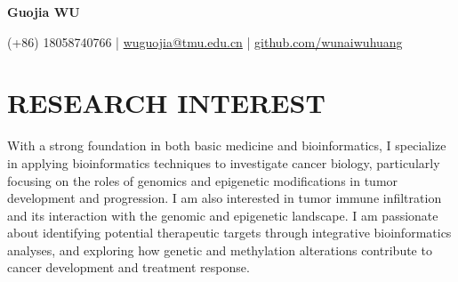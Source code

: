 \documentclass[a4paper,11pt]{article}
\newcommand{\socialicon}[1]{\raisebox{-0.05em}{\resizebox{!}{1em}{#1}}}
\newcommand{\headerfontiii}{\fontfamily{ppl}\selectfont} %
\begin{document}
\begin{justify}
\headerfontiii

\begin{center}
    {\Huge\textbf{Guojia WU}}
\end{center}
\vspace{-2mm}

\begin{center}
    \small{
    (+86) 18058740766 | \href{https://wuguojia@tmu.edu.cn}{wuguojia@tmu.edu.cn} | 
    \href{https://github.com/wunaiwuhuang}{github.com/wunaiwuhuang}
    }
\end{center}
\vspace{-8mm}


\vspace{2mm}

\section{\large{\textbf{RESEARCH INTEREST}}}
\vspace{1mm}
{
With a strong foundation in both basic medicine and bioinformatics, I specialize in applying bioinformatics techniques to investigate cancer biology, particularly focusing on the roles of genomics and epigenetic modifications in tumor development and progression. I am also interested in tumor immune infiltration and its interaction with the genomic and epigenetic landscape. I am passionate about identifying potential therapeutic targets through integrative bioinformatics analyses, and exploring how genetic and methylation alterations contribute to cancer development and treatment response.
}
\vspace{-2mm}




\end{justify}
\end{document}
